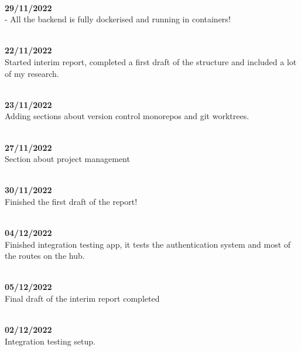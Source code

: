 \documentclass[titlepage]{article}
\begin{document}
\\
\noindent
\textbf{29/11/2022} \\
 - All the backend is fully dockerised and running in containers!

\\
\noindent
\textbf{22/11/2022} \\
Started interim report, completed a first draft of the structure and included a lot of my research.

\\
\noindent
\textbf{23/11/2022} \\
Adding sections about version control monorepos and git worktrees.

\\
\noindent
\textbf{27/11/2022} \\
Section about project management

\\
\noindent
\textbf{30/11/2022} \\
Finished the first draft of the report!

\\
\noindent
\textbf{04/12/2022} \\
Finished integration testing app, it tests the authentication system and most of the routes on the hub.

\\
\noindent
\textbf{05/12/2022} \\
Final draft of the interim report completed

\\
\noindent
\textbf{02/12/2022} \\
Integration testing setup.
\end{document}
